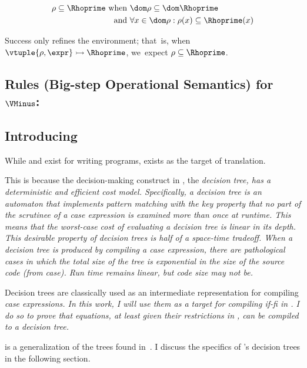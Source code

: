 \documentclass[manuscript,screen,review, 12pt, nonacm]{acmart}
\begin{document}
    \begin{align*}
    \rho \subseteq \Rhoprime \text{ when }&\dom\rho  \subseteq \dom \Rhoprime\\
    \text{ and } &\forall x \in \dom \rho: \rho(x) \subseteq \Rhoprime(x)
    \end{align*}
    
    \medskip
        
    Success only refines the environment; that~is, when ${\vtuple{\rho, \expr}}
    \rightarrowtail{} {\Rhoprime}$, we~expect $\rho \subseteq \Rhoprime$.
    
    \vfilbreak
    
    \subsection{Rules (Big-step Operational Semantics) for $\VMinus$:}
    \label{vmsemantics}
    \vmsemantics

\subsection{Introducing \D}
\label{d}

While \PPlus and \VMinus exist for writing programs, \D exists as the target
of translation. 

This is because the decision-making construct in \D, the \it{decision tree}, has
a deterministic and efficient cost model. Specifically, a decision tree is an
automaton that implements pattern matching with the key property that no part of
the scrutinee of a \it{case} expression is examined more than once at runtime.
This means that the worst-case cost of evaluating a decision tree is linear in
its depth. This desirable property of decision trees is half of a space-time
tradeoff. When a decision tree is produced by compiling a \it{case} expression,
there are pathological cases in which the total size of the tree is exponential
in the size of the source code (from \it{case}). Run time remains linear, but
code size may not be. 

Decision trees are classically used as an intermediate representation for
compiling \it{case} expressions. In this work, I will use them as a target for
compiling \it{if-fi} in \VMinus. I do so to prove that equations, at least given
their restrictions in \VMinus, can be compiled to a decision tree. 

\D is a generalization of the trees found in~\citet{maranget}. I discuss the
specifics of \D's decision trees in the following section. 
\end{document}
